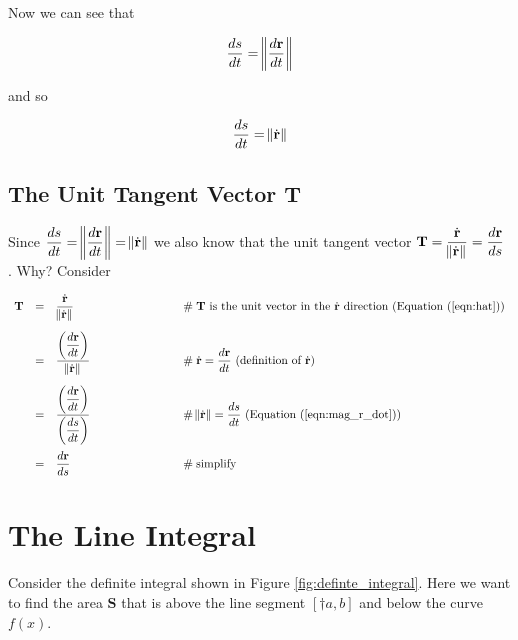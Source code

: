 \documentclass{article}
\theoremstyle{definition}
\begin{document}
\bigskip
\bigskip
\noindent
Now we can see that

\begin{equation*}
\dfrac{ds}{dt} = \norm{\dfrac{d\mathbf{r}}{dt}}
\end{equation*}

\bigskip
\noindent
and so

\begin{equation}
\dfrac{ds}{dt} = \norm{\dot{\mathbf{r}}}
\label{eqn:mag_r_dot}
\end{equation}


\bigskip
\subsection{The Unit Tangent Vector $\mathbf{T}$}
{ 
Since $\dfrac{ds}{dt} = \norm{\dfrac{d\mathbf{r}}{dt}} = \norm{\dot{\mathbf{r}}}$
we also know that the unit tangent vector $\mathbf{T} = 
\dfrac{\dot{\mathbf{r}}}{\norm{\dot{\mathbf{r}}}}= \dfrac{d\mathbf{r}}{ds}$ 
\cite{unit_tangent_and_normal_vectors}. Why? Consider
\par}


\bigskip
\begin{equation*}
\begin{array}{lllll}
\mathbf{T}
&=& \dfrac{\dot{\mathbf{r}}} {\norm{\dot{\mathbf{r}}}} 
			&\hspace{7em} \mathrel{\#} \text{$\mathbf{T}$ is the unit vector in the 
			$\dot{\mathbf{r}}$ direction (Equation (\ref{eqn:hat}))} \\
[15 pt]
&=& \dfrac{\left (\dfrac{d\mathbf{r}}{dt}\right )}{\norm{\dot{\mathbf{r}}}} 
			&\hspace{7em} \mathrel{\#} \dot{\mathbf{r}} = \dfrac{d\mathbf{r}}{dt}
			\text{ (definition of $\dot{\mathbf{r}}$)} \\
[15 pt]
&=& \dfrac{\left (\dfrac{d\mathbf{r}}{dt}\right )}{\left (\dfrac{ds}{dt} \right )} 
			&\hspace{7em} \mathrel{\#} \norm{\dot{\mathbf{r}}} = \dfrac{ds}{dt}
			\text{ (Equation (\ref{eqn:mag_r_dot}))} \\
[25 pt]
&=& \dfrac{d\mathbf{r}}{ds}
			&\hspace{7em} \mathrel{\#} \text{simplify}
\end{array}
\end{equation*}


\bigskip
\section{The Line Integral}
\label{sec:line_integrals}
Consider the definite integral shown in Figure
\ref{fig:definte_integral}.  Here we want to find 
the area $\mathbf{S}$ that is above the line segment 
$[†a,b]$ and below the curve $f(x)$.
\end{document}
